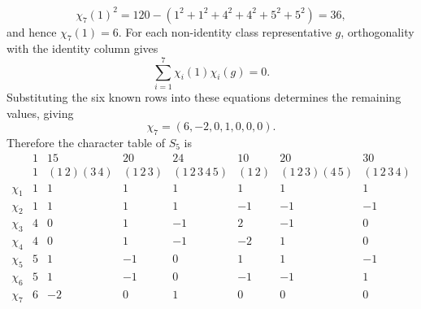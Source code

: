 \documentclass[../Odyssey_Project.tex]{subfiles}
\begin{document}
\begin{solution}
    \[
        \chi_7(1)^2
        =
        120-(1^2+1^2+4^2+4^2+5^2+5^2)
        =36,
    \]
    and hence $\chi_7(1)=6$. For each non-identity class representative $g$, orthogonality with the identity column gives
    \[
        \sum_{i=1}^{7}\chi_i(1)\chi_i(g)=0.
    \]
    Substituting the six known rows into these equations determines the remaining values, giving
    \[
        \chi_7=(6,-2,0,1,0,0,0).
    \]
    Therefore the character table of $S_5$ is
    \[
        \begin{array}{c|ccccccc}
            &1&15&20&24&10&20&30\\
            &1&(1\,2)(3\,4)&(1\,2\,3)&(1\,2\,3\,4\,5)&(1\,2)&(1\,2\,3)(4\,5)&(1\,2\,3\,4)\\
            \hline
            \chi_1&1&1&1&1&1&1&1\\
            \chi_2&1&1&1&1&-1&-1&-1\\
            \chi_3&4&0&1&-1&2&-1&0\\
            \chi_4&4&0&1&-1&-2&1&0\\
            \chi_5&5&1&-1&0&1&1&-1\\
            \chi_6&5&1&-1&0&-1&-1&1\\
            \chi_7&6&-2&0&1&0&0&0
        \end{array}
    \]
\end{solution}
\end{document}
